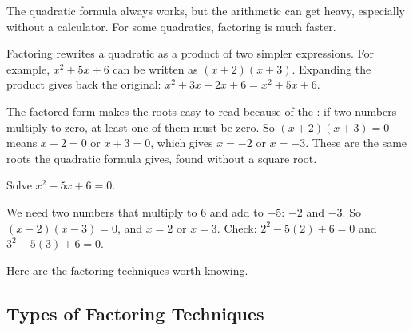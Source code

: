 The quadratic formula always works, but the arithmetic can get heavy,
especially without a calculator. For some quadratics,
factoring is much faster.

Factoring rewrites a quadratic as a product of two simpler expressions. For
example, $x^2 + 5x + 6$ can be written as $(x + 2)(x + 3)$. Expanding the
product gives back the original: $x^2 + 3x + 2x + 6 = x^2 + 5x + 6$.

The factored form makes the roots easy to read because of the
: if two numbers
multiply to zero, at least one of them must be zero. So
$(x + 2)(x + 3) = 0$ means $x + 2 = 0$ or $x + 3 = 0$, which gives $x = -2$
or $x = -3$. These are the same roots the quadratic formula gives, found
without a square root.

\begin{Worked}
\begin{Problem}
Solve $x^2 - 5x + 6 = 0$.
\end{Problem}
\begin{Solution}
We need two numbers that multiply to 6 and add to $-5$:
$-2$ and $-3$. So $(x - 2)(x - 3) = 0$, and $x = 2$ or $x = 3$. Check:
$2^2 - 5(2) + 6 = 0$ and $3^2 - 5(3) + 6 = 0$.
\end{Solution}
\end{Worked}

Here are the factoring techniques worth knowing.

\subsection*{Types of Factoring Techniques}


